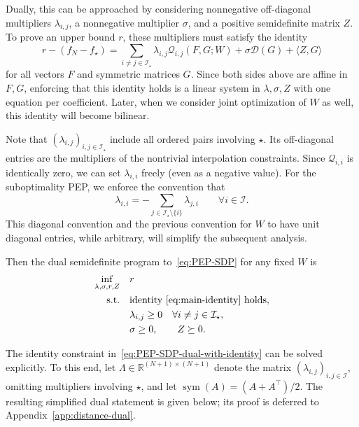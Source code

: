 \documentclass[11pt]{article}
\begin{document}
Dually, this can be approached by considering nonnegative off-diagonal multipliers $\lambda_{i,j}$, a nonnegative multiplier $\sigma$, and a positive semidefinite matrix $Z$. To prove an upper bound $r$, these multipliers must satisfy the identity
\begin{equation} \label{eq:main-identity}
    r - (f_N-f_\star) = \sum_{i\neq j\in\mathcal{I}_\star} \lambda_{i,j}\mathcal{Q}_{i,j}(F,G;W) + \sigma \mathcal{D}(G) + \langle Z,G\rangle
\end{equation}
for all vectors $F$ and symmetric matrices $G$. 
Since both sides above are affine in $F,G$, enforcing that this identity holds is a linear system in $\lambda,\sigma,Z$ with one equation per coefficient. Later, when we consider joint optimization of $W$ as well, this identity will become bilinear.

Note that $(\lambda_{i,j})_{i,j\in\mathcal{I}_\star}$ include all ordered pairs involving $\star$. Its off-diagonal entries are the multipliers of the nontrivial interpolation constraints. Since $\mathcal{Q}_{i,i}$ is identically zero, we can set $\lambda_{i,i}$ freely (even as a negative value). For the suboptimality PEP, we enforce the convention that
\begin{equation}\label{eq:distance-lambda-diagonal}
    \lambda_{i,i}=-\sum_{j\in\mathcal{I}_\star\setminus\{i\}}\lambda_{j,i}
    \qquad \forall i\in\mathcal{I}.
\end{equation}
This diagonal convention and the previous convention for $W$ to have unit diagonal entries, while arbitrary, will simplify the subsequent analysis.

Then the dual semidefinite program to~\eqref{eq:PEP-SDP} for any fixed $W$ is
\begin{equation} \label{eq:PEP-SDP-dual-with-identity}
\begin{aligned}
    \inf_{\lambda,\sigma,r,Z}\quad & r\\
    \mathrm{s.t.}\quad
    &\text{identity~\eqref{eq:main-identity} holds},\\
    &\lambda_{i,j}\geq0 \quad \forall i\neq j\in\mathcal{I}_\star,\\
    &\sigma\geq0, \qquad Z\succeq0.
\end{aligned}
\end{equation}

The identity constraint in~\eqref{eq:PEP-SDP-dual-with-identity} can be solved explicitly. To this end, let $\Lambda\in\mathbb{R}^{(N+1)\times(N+1)}$ denote the matrix $(\lambda_{i,j})_{i,j\in\mathcal I}$, omitting multipliers involving $\star$, and let $\operatorname{sym}(A)=(A+A^\top)/2$. The resulting simplified dual statement is given below; its proof is deferred to Appendix~\ref{app:distance-dual}.
\end{document}
